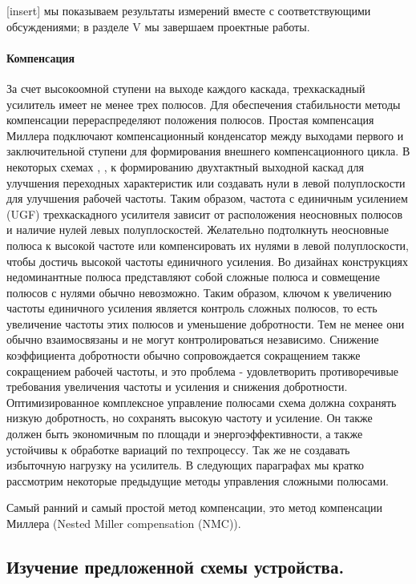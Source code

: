 \documentclass[a4paper,12pt]{article} %
\begin{document}
[insert] мы показываем результаты измерений вместе с соответствующими обсуждениями; в разделе V мы завершаем проектные работы.


\paragraph{Компенсация}

За счет высокоомной ступени на выходе каждого каскада,  трехкаскадный усилитель имеет не менее трех полюсов. Для обеспечения стабильности методы компенсации перераспределяют положения полюсов. Простая компенсация Миллера  подключают компенсационный конденсатор между выходами первого и заключительной ступени для формирования внешнего компенсационного цикла. В некоторых схемах \cite{op_amp_comp5}, \cite{op_amp_comp6}, \cite{op_amp_comp7} к формированию двухтактный выходной каскад для улучшения переходных характеристик или создавать нули в левой полуплоскости для улучшения рабочей частоты. Таким образом, частота с единичным усилением (UGF) трехкаскадного усилителя зависит от расположения неосновных полюсов и наличие нулей левых полуплоскостей. Желательно подтолкнуть неосновные полюса к высокой частоте или компенсировать их нулями в левой полуплоскости, чтобы достичь высокой частоты единичного усиления. Во  дизайнах конструкциях недоминантные полюса представляют собой сложные полюса и совмещение  полюсов с нулями обычно невозможно. Таким образом, ключом к увеличению частоты единичного усиления является контроль сложных полюсов, то есть увеличение частоты этих полюсов и уменьшение добротности. Тем не менее они обычно взаимосвязаны и не могут контролироваться независимо. Снижение коэффициента добротности  обычно сопровождается сокращением также сокращением рабочей частоты, и это проблема - удовлетворить противоречивые требования увеличения частоты и усиления и снижения добротности. Оптимизированное комплексное управление полюсами схема должна сохранять низкую добротность, но сохранять  высокую частоту и усиление. Он также должен быть экономичным по площади и энергоэффективности, а также устойчивы к обработке вариаций по техпроцессу. Так же не создавать избыточную нагрузку на усилитель. В следующих параграфах мы кратко рассмотрим некоторые предыдущие методы управления сложными полюсами. 


Самый ранний и самый простой метод компенсации, это метод компенсации Миллера (Nested Miller compensation (NMC)).



\subsection{Изучение предложенной схемы устройства.}
\end{document}
